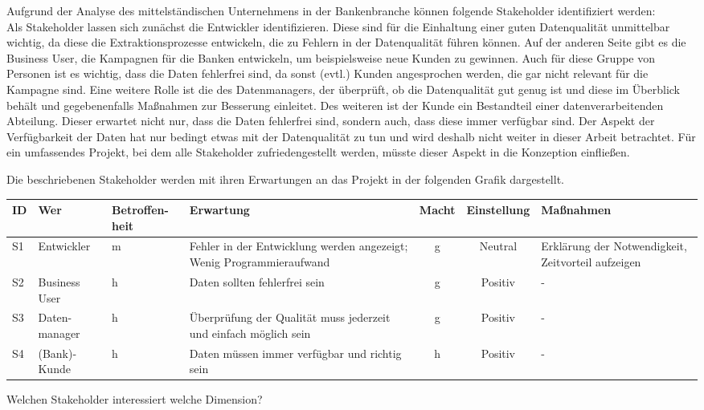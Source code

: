 Aufgrund der Analyse des mittelständischen Unternehmens in der Bankenbranche können folgende Stakeholder identifiziert werden: \\
Als Stakeholder lassen sich zunächst die Entwickler identifizieren.
Diese sind für die Einhaltung einer guten Datenqualität unmittelbar wichtig, da diese die Extraktionsprozesse entwickeln, die zu Fehlern in der Datenqualität führen können.
Auf der anderen Seite gibt es die Business User, die Kampagnen für die Banken entwickeln, um beispielsweise neue Kunden zu gewinnen. 
Auch für diese Gruppe von Personen ist es wichtig, dass die Daten fehlerfrei sind, da sonst (evtl.) Kunden angesprochen werden, die gar nicht relevant für die Kampagne sind.
Eine weitere Rolle ist die des Datenmanagers, der überprüft, ob die Datenqualität gut genug ist und diese im Überblick behält und gegebenenfalls Maßnahmen zur Besserung einleitet. 
Des weiteren ist der Kunde ein Bestandteil einer datenverarbeitenden Abteilung. 
Dieser erwartet nicht nur, dass die Daten fehlerfrei sind, sondern auch, dass diese immer verfügbar sind. 
Der Aspekt der Verfügbarkeit der Daten hat nur bedingt etwas mit der Datenqualität zu tun und wird deshalb nicht weiter in dieser Arbeit betrachtet.
Für ein umfassendes Projekt, bei dem alle Stakeholder zufriedengestellt werden, müsste dieser Aspekt in die Konzeption einfließen.

Die beschriebenen Stakeholder werden mit ihren Erwartungen an das Projekt in der folgenden Grafik dargestellt.

\begin{tabular}[h]{l|p{2cm}|>{\centering}p{1.5cm}|p{2.5cm}|c|c|p{3cm}}
ID & Wer        & Betroffen-heit & Erwartung & Macht & Einstellung & Maßnahmen  \\ \hline
S1 & Entwickler & m             & Fehler in der Entwicklung werden angezeigt; Wenig Programmieraufwand & g & Neutral & Erklärung der Notwendigkeit, Zeitvorteil aufzeigen  \\ \hline
S2 & Business User & h          & Daten sollten fehlerfrei sein & g & Positiv & - \\ \hline
S3 & Daten-manager & h          & Überprüfung der Qualität muss jederzeit und einfach möglich sein & g & Positiv & - \\ \hline
S4 & (Bank)-Kunde & h          & Daten müssen immer verfügbar und richtig sein & h & Positiv & - \\
\end{tabular}


Welchen Stakeholder interessiert welche Dimension?


